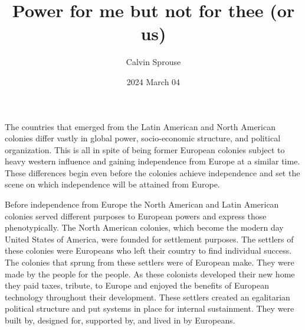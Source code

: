 \documentclass[a4paper, 12pt]{article}
\title{Power for me but not for thee (or us)}
\author{Calvin Sprouse}
\affil{Geography 101 World Regional Geography}
\date{2024 March 04}
\begin{document}
\maketitle


The countries that emerged from the Latin American and North American colonies differ vastly in global power, socio-economic structure, and political organization. This is all in spite of being former European colonies subject to heavy western influence and gaining independence from Europe at a similar time. These differences begin even before the colonies achieve independence and set the scene on which independence will be attained from Europe.

Before independence from Europe the North American and Latin American colonies served different purposes to European powers and express those phenotypically. The North American colonies, which become the modern day United States of America, were founded for settlement purposes. The settlers of these colonies were Europeans who left their country to find individual success. The colonies that sprung from these settlers were of European make. They were made by the people for the people. As these colonists developed their new home they paid taxes, tribute, to Europe and enjoyed the benefits of European technology throughout their development. These settlers created an egalitarian political structure and put systems in place for internal sustainment. They were built by, designed for, supported by, and lived in by Europeans.
\end{document}
